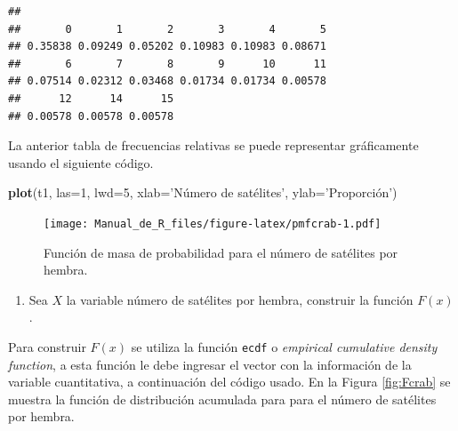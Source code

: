 \documentclass[10pt,]{krantz}
\makeatletter
\newenvironment{Shaded}{\begin{snugshade}}{\end{snugshade}}
\newcommand{\KeywordTok}[1]{\textcolor[rgb]{0.13,0.29,0.53}{\textbf{{#1}}}}
\newcommand{\DataTypeTok}[1]{\textcolor[rgb]{0.13,0.29,0.53}{{#1}}}
\newcommand{\DecValTok}[1]{\textcolor[rgb]{0.00,0.00,0.81}{{#1}}}
\newcommand{\StringTok}[1]{\textcolor[rgb]{0.31,0.60,0.02}{{#1}}}
\newcommand{\NormalTok}[1]{{#1}}
\providecommand{\tightlist}{%
  \setlength{\itemsep}{0pt}\setlength{\parskip}{0pt}}
\newenvironment{kframe}{%
\medskip{}
\setlength{\fboxsep}{.8em}
 \def\at@end@of@kframe{}%
 \ifinner\ifhmode%
  \def\at@end@of@kframe{\end{minipage}}%
  \begin{minipage}{\columnwidth}%
 \fi\fi%
 \def\FrameCommand##1{\hskip\@totalleftmargin \hskip-\fboxsep
 \colorbox{shadecolor}{##1}\hskip-\fboxsep
     \hskip-\linewidth \hskip-\@totalleftmargin \hskip\columnwidth}%
 \MakeFramed {\advance\hsize-\width
   \@totalleftmargin\z@ \linewidth\hsize
   \@setminipage}}%
 {\par\unskip\endMakeFramed%
 \at@end@of@kframe}
\renewenvironment{Shaded}{\begin{kframe}}{\end{kframe}}
\makeatother
\begin{document}
\begin{Shaded}
\end{Shaded}

\begin{verbatim}
## 
##       0       1       2       3       4       5 
## 0.35838 0.09249 0.05202 0.10983 0.10983 0.08671 
##       6       7       8       9      10      11 
## 0.07514 0.02312 0.03468 0.01734 0.01734 0.00578 
##      12      14      15 
## 0.00578 0.00578 0.00578
\end{verbatim}

La anterior tabla de frecuencias relativas se puede representar
gráficamente usando el siguiente código.

\begin{Shaded}
\begin{Highlighting}[]
\KeywordTok{plot}\NormalTok{(t1, }\DataTypeTok{las=}\DecValTok{1}\NormalTok{, }\DataTypeTok{lwd=}\DecValTok{5}\NormalTok{, }\DataTypeTok{xlab=}\StringTok{'Número de satélites'}\NormalTok{,}
     \DataTypeTok{ylab=}\StringTok{'Proporción'}\NormalTok{)}
\end{Highlighting}
\end{Shaded}

\begin{figure}[htbp]
\centering
\texttt{[image: Manual\_de\_R\_files/figure-latex/pmfcrab-1.pdf]}
\caption{\label{fig:pmfcrab}Función de masa de probabilidad para el número
de satélites por hembra.}
\end{figure}

\begin{enumerate}
\def\labelenumi{\arabic{enumi})}
\setcounter{enumi}{1}
\tightlist
\item
  Sea \(X\) la variable número de satélites por hembra, construir la
  función \(F(x)\).
\end{enumerate}

Para construir \(F(x)\) se utiliza la función \texttt{ecdf} o
\emph{empirical cumulative density function}, a esta función le debe
ingresar el vector con la información de la variable cuantitativa, a
continuación del código usado. En la Figura \ref{fig:Fcrab} se muestra
la función de distribución acumulada para para el número de satélites
por hembra.
\end{document}
